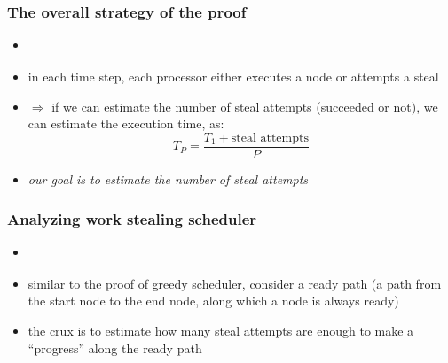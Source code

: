 \documentclass[12pt,dvipdfmx]{beamer}
\newcommand{\ao}[1]{{\color{blue}#1}}
\begin{document}
\begin{frame}
\frametitle{The overall strategy of the proof}

\begin{itemize}
\item []
\begin{center}
\def\svgwidth{0.5\textwidth}
{\scriptsize}
\end{center}

\item in each time step, each processor either
  executes a node or attempts a steal 

\item $\Rightarrow$ if we can estimate the number of steal
  attempts (succeeded or not),
  we can estimate the execution time, as:
\[ T_P = \frac{T_1 + \mbox{steal attempts}}{P}\]

\item \ao{\emph{our goal is to estimate the number of steal attempts}}
\end{itemize}
\end{frame}

\begin{frame}
\frametitle{Analyzing work stealing scheduler}

\begin{itemize}
\item []
\begin{center}
\def\svgwidth{0.5\textwidth}
{\scriptsize}
\end{center}

\item<1-> similar to the proof of greedy scheduler,
  consider a ready path (a path from the start node to the end
  node, along which a node is always ready)

\item<2-> the crux is to estimate how many steal attempts are
  enough to make a ``progress'' along the ready path

\end{itemize}
\end{frame}
\end{document}
